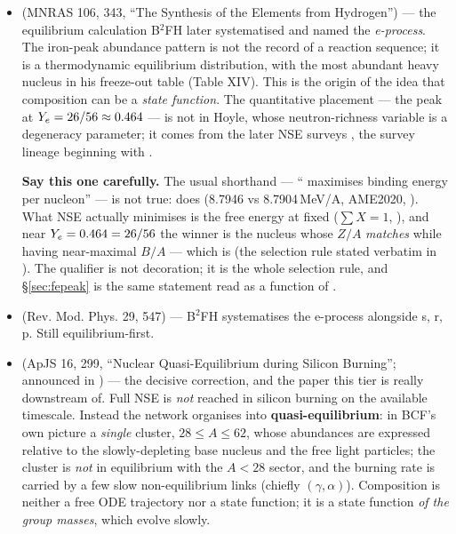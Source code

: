 \begin{itemize}
\item \textbf{\citet{hoyle1946}} (MNRAS 106, 343, ``The Synthesis of the
  Elements from Hydrogen'') --- the equilibrium calculation B$^2$FH later
  systematised and named the \emph{e-process}. The iron-peak abundance pattern
  is not the record of a reaction sequence; it is a thermodynamic equilibrium
  distribution, with  the most abundant heavy nucleus in his
  freeze-out table (Table XIV). This is the origin of the idea that composition
  can be a \emph{state function}. The quantitative placement --- the
   peak at $Y_{e} = 26/56 \approx 0.464$ --- is not in Hoyle, whose
  neutron-richness variable is a degeneracy parameter; it comes from the later
  NSE surveys \citep[Fig.~2;][]{hwe1985}, the survey lineage beginning with
  \citet{clifford1965}.

  \begin{warn}
  \textbf{Say this one carefully.} The usual shorthand --- ``
  maximises binding energy per nucleon'' --- is not true:  does
  (8.7946 vs 8.7904\,MeV/A, AME2020, \citealp{ame2020}). What NSE actually
  minimises is the free energy at fixed ($\sum X = 1$, \Ye), and near
  $Y_{e} = 0.464 = 26/56$ the winner is the nucleus whose $Z/A$ \emph{matches}
  \Ye{} while having near-maximal $B/A$ --- which is  (the selection
  rule stated verbatim in \citealp{seitenzahl2008}). The \Ye{} qualifier is not
  decoration; it is the whole selection rule, and \S\ref{sec:fepeak} is the same
  statement read as a function of \Ye.
  \end{warn}

\item \textbf{\citet{bbfh1957}} (Rev. Mod. Phys. 29, 547) --- B$^2$FH
  systematises the e-process alongside s, r, p. Still equilibrium-first.

\item \textbf{\citet{bcf1968apjs}} (ApJS 16, 299, ``Nuclear Quasi-Equilibrium
  during Silicon Burning''; announced in \citealp{bcf1968prl}) --- the decisive
  correction, and the paper this tier is really downstream of. Full NSE is
  \emph{not} reached in silicon burning on the available timescale. Instead the
  network organises into \textbf{quasi-equilibrium}: in BCF's own picture a
  \emph{single} cluster, $28 \le A \le 62$, whose abundances are expressed
  relative to the slowly-depleting base nucleus  and the free light
  particles; the cluster is \emph{not} in equilibrium with the $A < 28$ sector,
  and the burning rate is carried by a few slow non-equilibrium links (chiefly
  $(\gamma,\alpha)$). Composition is neither a free ODE
  trajectory nor a state function; it is a state function \emph{of the group
  masses}, which evolve slowly.


\end{itemize}
